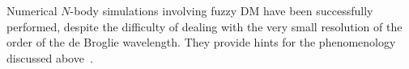 Numerical $N$-body simulations involving fuzzy DM have been successfully performed, despite the difficulty of dealing with the very small resolution of the order of the de Broglie wavelength.  They provide hints for the phenomenology discussed above~\cite{Sims_alt_DM}. 







